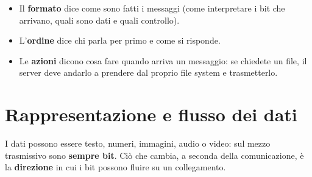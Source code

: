 \begin{itemize}
    \item Il \textbf{formato} dice come sono fatti i messaggi (come interpretare i bit che arrivano,
          quali sono dati e quali controllo).
    \item L'\textbf{ordine} dice chi parla per primo e come si risponde.
    \item Le \textbf{azioni} dicono cosa fare quando arriva un messaggio: se chiedete un file, il
          server deve andarlo a prendere dal proprio file system e trasmetterlo.
\end{itemize}


\section{Rappresentazione e flusso dei dati}

I dati possono essere testo, numeri, immagini, audio o video: sul mezzo trasmissivo sono
\textbf{sempre bit}. Ciò che cambia, a seconda della comunicazione, è la \textbf{direzione}
in cui i bit possono fluire su un collegamento.

